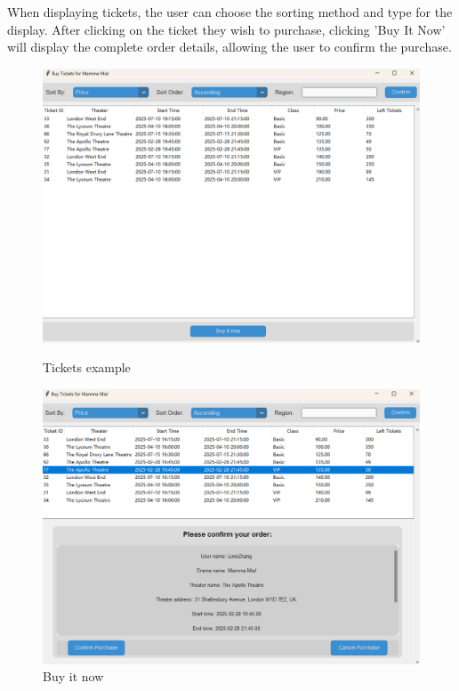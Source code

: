 \documentclass[12pt]{article}
\begin{document}
\par When displaying tickets, the user can choose the sorting method and type for the display. After clicking on the ticket they wish to purchase, clicking 'Buy It Now' will display the complete order details, allowing the user to confirm the purchase.
\begin{figure}[H]
    \centering
    \begin{minipage}{0.48\textwidth}
        \centering
        \includegraphics[width=\textwidth]{13.png}
        \caption{Tickets example} 
        \label{Figure 13}
    \end{minipage}
    \hfill
    \begin{minipage}{0.48\textwidth}
        \centering
        \includegraphics[width=\textwidth]{14.png}
        \caption{Buy it now}
        \label{Figure 14}
    \end{minipage}
\end{figure}
\end{document}
